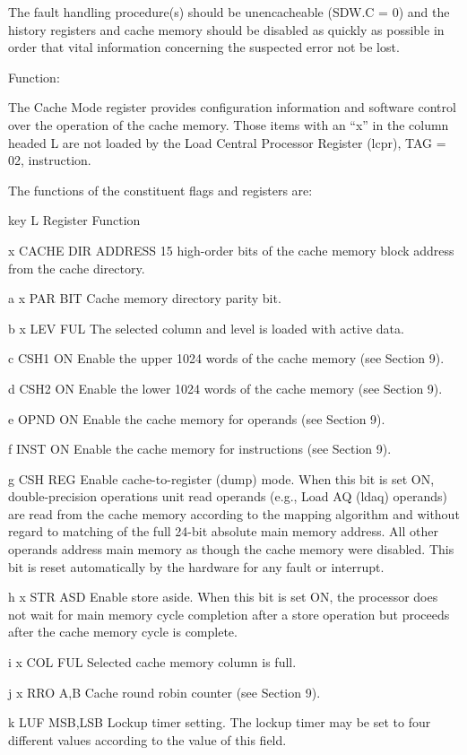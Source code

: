 The fault handling procedure(s) should be unencacheable (SDW.C = 0) and the
history registers and cache memory should be disabled as quickly as possible in
order that vital information concerning the suspected error not be lost.

Function:

The Cache Mode register provides configuration information and software control
over the operation of the cache memory. Those items with an {``}x'' in the
column headed L are not loaded by the Load Central Processor Register (lcpr),
TAG = 02, instruction.

The functions of the constituent flags and registers are:

key L Register Function

x CACHE DIR ADDRESS 15 high-order bits of the cache memory block address from
the cache directory.

a x PAR BIT Cache memory directory parity bit.

b x LEV FUL The selected column and level is loaded with active data.

c CSH1 ON Enable the upper 1024 words of the cache memory (see Section 9).

d CSH2 ON Enable the lower 1024 words of the cache memory (see Section 9).

e OPND ON Enable the cache memory for operands (see Section 9).

f INST ON Enable the cache memory for instructions (see Section 9).

g CSH REG Enable cache-to-register (dump) mode. When this bit is set ON,
double-precision operations unit read operands (e.g., Load AQ (ldaq) operands)
are read from the cache memory according to the mapping algorithm and without
regard to matching of the full 24-bit absolute main memory address.  All other
operands address main memory as though the cache memory were disabled. This bit
is reset automatically by the hardware for any fault or interrupt.

h x STR ASD Enable store aside. When this bit is set ON, the processor does not
wait for main memory cycle completion after a store operation but proceeds
after the cache memory cycle is complete.

i x COL FUL Selected cache memory column is full.

j x RRO A,B Cache round robin counter (see Section 9).

k LUF MSB,LSB Lockup timer setting. The lockup timer may be set to four
different values according to the value of this field.

